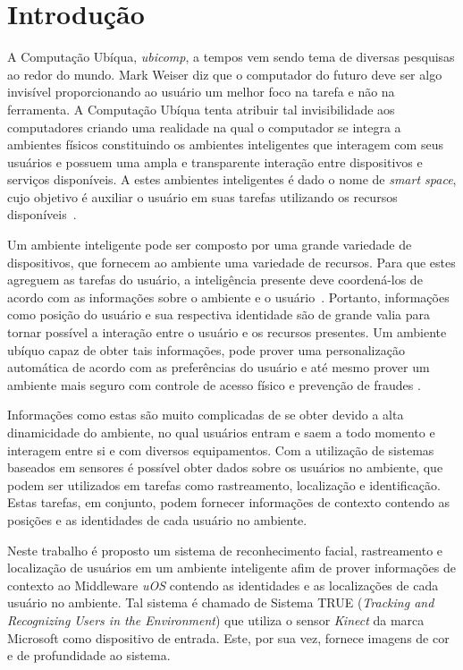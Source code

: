 
\chapter{Introdução}
	
A Computação Ubíqua, \textit{ubicomp}, a tempos vem sendo tema de diversas pesquisas ao redor do mundo. Mark Weiser diz que o computador do futuro deve ser algo invisível proporcionando ao usuário um melhor foco na tarefa e não na ferramenta. A Computação Ubíqua tenta atribuir tal invisibilidade aos computadores criando uma realidade na qual o computador se integra a ambientes físicos constituindo os ambientes inteligentes que interagem com seus usuários e possuem uma ampla e transparente interação entre dispositivos e serviços disponíveis. A estes ambientes inteligentes é dado o nome de \textit{smart space}, cujo objetivo é auxiliar o usuário em suas tarefas utilizando os recursos disponíveis~\cite{fabriciobuzzeto,alegomes,weiser1, weiser2}.

Um ambiente inteligente pode ser composto por uma grande variedade de dispositivos, que fornecem ao ambiente uma variedade de recursos. Para que estes agreguem as tarefas do usuário, a inteligência presente deve coordená-los de acordo com as informações sobre o ambiente e o usuário~\cite{fabriciobuzzeto}. Portanto, informações como posição do usuário e sua respectiva identidade são de grande valia para tornar possível a interação entre o usuário e os recursos presentes. Um ambiente ubíquo capaz de obter tais informações, pode prover uma personalização automática de acordo com as preferências do usuário e até mesmo prover um ambiente mais seguro com controle de acesso físico e prevenção de fraudes \cite{saocarlos}. 

Informações como estas são muito complicadas de se obter devido a alta dinamicidade do ambiente, no qual usuários entram e saem a todo momento e interagem entre si e com diversos equipamentos. Com a utilização de sistemas baseados em sensores é possível obter dados sobre os usuários no ambiente, que podem ser utilizados em tarefas como rastreamento, localização e identificação. Estas tarefas, em conjunto, podem fornecer informações de contexto contendo as posições e as identidades de cada usuário no ambiente.

Neste trabalho é proposto um sistema de reconhecimento facial, rastreamento e localização de usuários em um ambiente inteligente afim de prover informações de contexto ao Middleware \textit{uOS} contendo as identidades e as localizações de cada usuário no ambiente. Tal sistema é chamado de Sistema TRUE (\textit{Tracking and Recognizing Users in the Environment}) que utiliza o sensor \textit{Kinect} da marca Microsoft como dispositivo de entrada. Este, por sua vez, fornece imagens de cor e de profundidade ao sistema.

